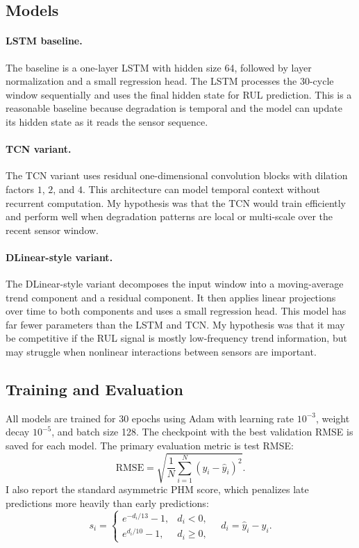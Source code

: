 \documentclass[10pt]{article}
\begin{document}
\subsection{Models}

\paragraph{LSTM baseline.}
The baseline is a one-layer LSTM \cite{hochreiter1997lstm} with hidden size 64, followed by layer normalization and a small regression head. The LSTM processes the 30-cycle window sequentially and uses the final hidden state for RUL prediction. This is a reasonable baseline because degradation is temporal and the model can update its hidden state as it reads the sensor sequence.

\paragraph{TCN variant.}
The TCN variant uses residual one-dimensional convolution blocks with dilation factors $1$, $2$, and $4$. This architecture can model temporal context without recurrent computation. My hypothesis was that the TCN would train efficiently and perform well when degradation patterns are local or multi-scale over the recent sensor window.

\paragraph{DLinear-style variant.}
The DLinear-style variant decomposes the input window into a moving-average trend component and a residual component. It then applies linear projections over time to both components and uses a small regression head. This model has far fewer parameters than the LSTM and TCN. My hypothesis was that it may be competitive if the RUL signal is mostly low-frequency trend information, but may struggle when nonlinear interactions between sensors are important.

\subsection{Training and Evaluation}

All models are trained for 30 epochs using Adam with learning rate $10^{-3}$, weight decay $10^{-5}$, and batch size 128. The checkpoint with the best validation RMSE is saved for each model. The primary evaluation metric is test RMSE:
\begin{equation}
\mathrm{RMSE} = \sqrt{\frac{1}{N}\sum_{i=1}^{N}(y_i - \hat{y}_i)^2}.
\end{equation}
I also report the standard asymmetric PHM score, which penalizes late predictions more heavily than early predictions:
\begin{equation}
s_i =
\begin{cases}
e^{-d_i/13} - 1, & d_i < 0,\\
e^{d_i/10} - 1, & d_i \ge 0,
\end{cases}
\quad d_i = \hat{y}_i - y_i.
\end{equation}
\end{document}
